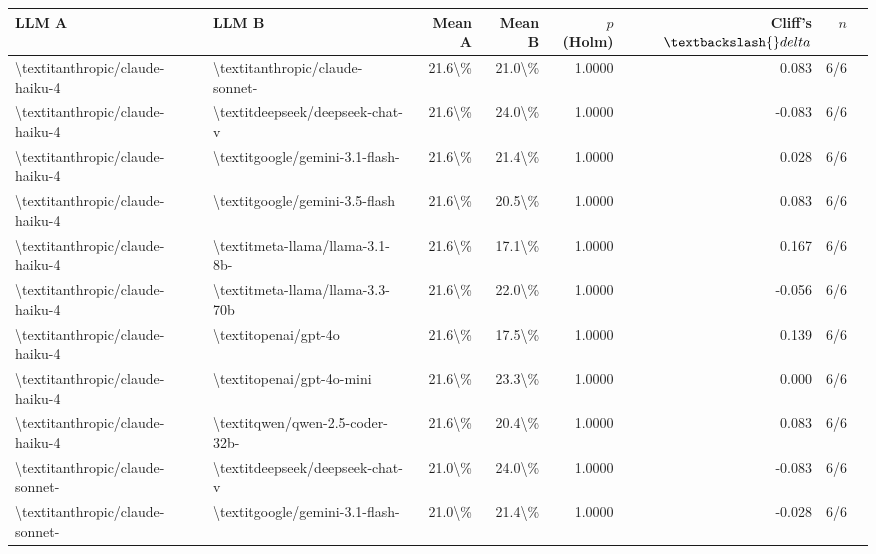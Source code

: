 \begin{table}[htbp]
\centering
{\small
\begin{tabular}{ll|rrrrrl}
\toprule
\textbf{LLM A} & \textbf{LLM B} & \textbf{Mean A} & \textbf{Mean B} & \textbf{$p$ (Holm)} & \textbf{Cliff's $\textbackslash{}delta$} & \textbf{$n$} \\
\midrule
\textbackslash{}textit{anthropic/claude-haiku-4} & \textbackslash{}textit{anthropic/claude-sonnet-} & 21.6\textbackslash{}\% & 21.0\textbackslash{}\% & 1.0000 & 0.083 & 6/6 \\
\textbackslash{}textit{anthropic/claude-haiku-4} & \textbackslash{}textit{deepseek/deepseek-chat-v} & 21.6\textbackslash{}\% & 24.0\textbackslash{}\% & 1.0000 & -0.083 & 6/6 \\
\textbackslash{}textit{anthropic/claude-haiku-4} & \textbackslash{}textit{google/gemini-3.1-flash-} & 21.6\textbackslash{}\% & 21.4\textbackslash{}\% & 1.0000 & 0.028 & 6/6 \\
\textbackslash{}textit{anthropic/claude-haiku-4} & \textbackslash{}textit{google/gemini-3.5-flash} & 21.6\textbackslash{}\% & 20.5\textbackslash{}\% & 1.0000 & 0.083 & 6/6 \\
\textbackslash{}textit{anthropic/claude-haiku-4} & \textbackslash{}textit{meta-llama/llama-3.1-8b-} & 21.6\textbackslash{}\% & 17.1\textbackslash{}\% & 1.0000 & 0.167 & 6/6 \\
\textbackslash{}textit{anthropic/claude-haiku-4} & \textbackslash{}textit{meta-llama/llama-3.3-70b} & 21.6\textbackslash{}\% & 22.0\textbackslash{}\% & 1.0000 & -0.056 & 6/6 \\
\textbackslash{}textit{anthropic/claude-haiku-4} & \textbackslash{}textit{openai/gpt-4o} & 21.6\textbackslash{}\% & 17.5\textbackslash{}\% & 1.0000 & 0.139 & 6/6 \\
\textbackslash{}textit{anthropic/claude-haiku-4} & \textbackslash{}textit{openai/gpt-4o-mini} & 21.6\textbackslash{}\% & 23.3\textbackslash{}\% & 1.0000 & 0.000 & 6/6 \\
\textbackslash{}textit{anthropic/claude-haiku-4} & \textbackslash{}textit{qwen/qwen-2.5-coder-32b-} & 21.6\textbackslash{}\% & 20.4\textbackslash{}\% & 1.0000 & 0.083 & 6/6 \\
\textbackslash{}textit{anthropic/claude-sonnet-} & \textbackslash{}textit{deepseek/deepseek-chat-v} & 21.0\textbackslash{}\% & 24.0\textbackslash{}\% & 1.0000 & -0.083 & 6/6 \\
\textbackslash{}textit{anthropic/claude-sonnet-} & \textbackslash{}textit{google/gemini-3.1-flash-} & 21.0\textbackslash{}\% & 21.4\textbackslash{}\% & 1.0000 & -0.028 & 6/6 \\

\end{tabular}}
\end{table}
